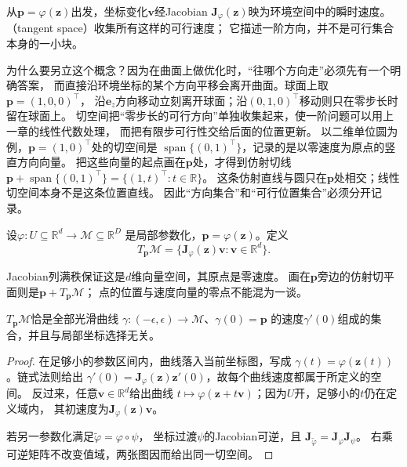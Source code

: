 从$\bm p=\varphi(\bm z)$出发，坐标变化$\bm v$经Jacobian
$\bm J_\varphi(\bm z)$映为环境空间中的瞬时速度。
（tangent space）收集所有这样的可行速度；
它描述一阶方向，并不是可行集合本身的一小块。

为什么要另立这个概念？因为在曲面上做优化时，“往哪个方向走”必须先有一个明确答案，
而直接沿环境坐标的某个方向平移会离开曲面。球面上取$\bm p=(1,0,0)^\top$，
沿$\bm e_z$方向移动立刻离开球面；沿$(0,1,0)^\top$移动则只在零步长时留在球面上。
切空间把“零步长的可行方向”单独收集起来，使一阶问题可以用上一章的线性代数处理，
而把有限步可行性交给后面的位置更新。
以二维单位圆为例，$\bm p=(1,0)^\top$处的切空间是
$\operatorname{span}\{(0,1)^\top\}$，记录的是以零速度为原点的竖直方向向量。
把这些向量的起点画在$\bm p$处，才得到仿射切线
$\bm p+\operatorname{span}\{(0,1)^\top\}=\{(1,t)^\top:t\in\mathbb R\}$。
这条仿射直线与圆只在$\bm p$处相交；线性切空间本身不是这条位置直线。
因此“方向集合”和“可行位置集合”必须分开记录。

\begin{definition}[嵌入流形的切空间]
\label{def:geometry-tangent-space}
设$\varphi:U\subseteq\mathbb R^d\to\mathcal M\subseteq\mathbb R^D$
是局部参数化，$\bm p=\varphi(\bm z)$。定义
\begin{equation}
 T_{\bm p}\mathcal M
 =\{\bm J_\varphi(\bm z)\bm v:\bm v\in\mathbb R^d\}.
 \label{eq:geometry-tangent-space-chart}
\end{equation}
\end{definition}
Jacobian列满秩保证这是$d$维向量空间，其原点是零速度。
画在$\bm p$旁边的仿射切平面则是$\bm p+T_{\bm p}\mathcal M$；
点的位置与速度向量的零点不能混为一谈。

\begin{lemma}[曲线速度与坐标刻画相容]
\label{lem:geometry-tangent-curves}
$T_{\bm p}\mathcal M$恰是全部光滑曲线
$\gamma:(-\epsilon,\epsilon)\to\mathcal M$、$\gamma(0)=\bm p$
的速度$\gamma'(0)$组成的集合，并且与局部坐标选择无关。
\end{lemma}
\begin{proof}
在足够小的参数区间内，曲线落入当前坐标图，写成
$\gamma(t)=\varphi(\bm z(t))$。链式法则给出
$\gamma'(0)=\bm J_\varphi(\bm z)\bm z'(0)$，故每个曲线速度都属于所定义的空间。
反过来，任意$\bm v\in\mathbb R^d$给出曲线
$t\mapsto\varphi(\bm z+t\bm v)$；因为$U$开，足够小的$t$仍在定义域内，
其初速度为$\bm J_\varphi(\bm z)\bm v$。

若另一参数化满足$\widetilde\varphi=\varphi\circ\psi$，
坐标过渡$\psi$的Jacobian可逆，且
$\bm J_{\widetilde\varphi}=\bm J_\varphi\bm J_\psi$。
右乘可逆矩阵不改变值域，两张图因而给出同一切空间。
\end{proof}

